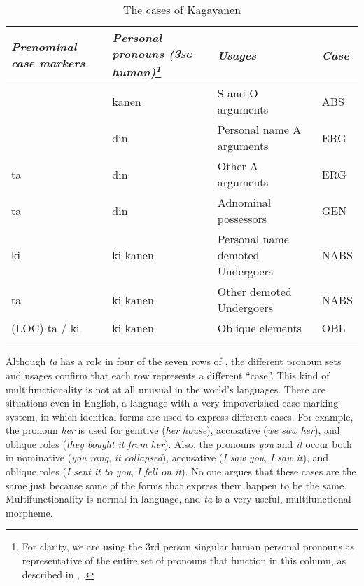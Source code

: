 \begin{table}
\caption{The cases of Kagayanen}
\label{tab:cases}
\begin{tabularx}{\textwidth}{QQQl}
\lsptoprule
{\bfseries\itshape Prenominal case markers} & \bfseries\itshape Personal pronouns (3\textsc{sg} human)\footnote{For
        clarity, we are using the 3rd person singular human personal pronouns as representative of the entire set of pronouns that function in this column, as described in , .
        }
        & {\bfseries\itshape Usages} & {\bfseries\itshape Case} \\
\midrule
\emptyset{} & kanen & S and O arguments & ABS \\
\tablevspace
\emptyset{} & din & Personal name A arguments & ERG \\
\tablevspace
ta & din & Other A arguments & ERG \\
\tablevspace
ta & din & Adnominal possessors & GEN \\
\tablevspace
ki & ki kanen & Personal name demoted Undergoers & NABS \\
\tablevspace
ta & ki kanen & Other demoted Undergoers & NABS \\
\tablevspace
(LOC) ta / ki & ki kanen & Oblique elements & OBL \\
\lspbottomrule
\end{tabularx}
\end{table}

Although \textit{ta} has a role in four of the seven rows of , the different pronoun sets and usages confirm that each row represents a different “case”. This kind of multifunctionality is not at all unusual in the world’s languages. There are situations even in English, a language with a very impoverished case marking system, in which identical forms are used to express different cases. For example, the pronoun \textit{her} is used for genitive (\textit{her house}), accusative (\textit{we saw her}), and oblique roles (\textit{they bought it from her}). Also, the pronouns \textit{you} and \textit{it} occur both in nominative (\textit{you rang}, \textit{it collapsed}), accusative (\textit{I saw you}, \textit{I saw it}), and oblique roles (\textit{I sent it to you}, \textit{I fell on it}). No one argues that these cases are the same just because some of the forms that express them happen to be the same. Multifunctionality is normal in language, and \textit{ta} is a very useful, multifunctional morpheme.

